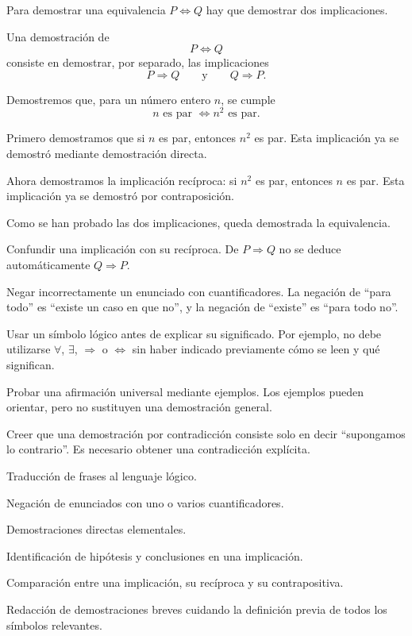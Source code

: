 Para demostrar una equivalencia $P\Leftrightarrow Q$ hay que demostrar dos implicaciones.

\begin{definicion}
Una demostración de
\[
  P\Leftrightarrow Q
\]
consiste en demostrar, por separado, las implicaciones
\[
  P\Rightarrow Q
  \qquad \text{y} \qquad
  Q\Rightarrow P.
\]
\end{definicion}

\begin{ejemplo}
Demostremos que, para un número entero $n$, se cumple
\[
  n \text{ es par } \Leftrightarrow n^2 \text{ es par}.
\]

Primero demostramos que si $n$ es par, entonces $n^2$ es par. Esta implicación ya se demostró mediante demostración directa.

Ahora demostramos la implicación recíproca: si $n^2$ es par, entonces $n$ es par. Esta implicación ya se demostró por contraposición.

Como se han probado las dos implicaciones, queda demostrada la equivalencia.
\end{ejemplo}

\begin{erroresfrecuentes}
  \item Confundir una implicación con su recíproca. De $P\Rightarrow Q$ no se deduce automáticamente $Q\Rightarrow P$.
  \item Negar incorrectamente un enunciado con cuantificadores. La negación de ``para todo'' es ``existe un caso en que no'', y la negación de ``existe'' es ``para todo no''.
  \item Usar un símbolo lógico antes de explicar su significado. Por ejemplo, no debe utilizarse $\forall$, $\exists$, $\Rightarrow$ o $\Leftrightarrow$ sin haber indicado previamente cómo se leen y qué significan.
  \item Probar una afirmación universal mediante ejemplos. Los ejemplos pueden orientar, pero no sustituyen una demostración general.
  \item Creer que una demostración por contradicción consiste solo en decir ``supongamos lo contrario''. Es necesario obtener una contradicción explícita.
\end{erroresfrecuentes}

\begin{seminario}
  \item Traducción de frases al lenguaje lógico.
  \item Negación de enunciados con uno o varios cuantificadores.
  \item Demostraciones directas elementales.
  \item Identificación de hipótesis y conclusiones en una implicación.
  \item Comparación entre una implicación, su recíproca y su contrapositiva.
  \item Redacción de demostraciones breves cuidando la definición previa de todos los símbolos relevantes.
\end{seminario}

